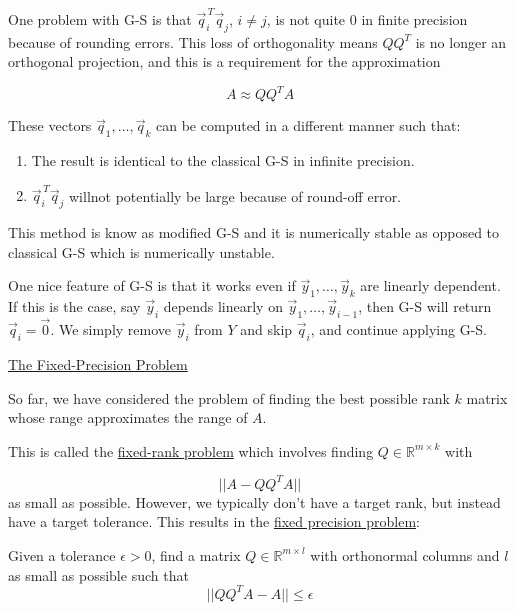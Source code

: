 One problem with G-S is that $\vec{q}^{\,T}_i\vec{q}_j$, $i \neq j$, is not quite 0 in finite precision because of rounding errors. This loss of orthogonality means $QQ^T$ is no longer an orthogonal projection, and this is a requirement for the approximation

\begin{equation*}
    A \approx QQ^TA
\end{equation*}

These vectors $\vec{q}_1, \ldots, \vec{q}_{k}$ can be computed in a different manner such that:

\begin{enumerate}[1)]
    \item The result is identical to the classical G-S in infinite precision.
    \item $\vec{q}^{\,T}_i\vec{q}_j$ willnot potentially be large because of round-off error.
\end{enumerate}
This method is know as modified G-S and it is numerically stable as opposed to classical G-S which is numerically unstable.

One nice feature of G-S is that it works even if $\vec{y}_1, \ldots, \vec{y}_{k}$ are linearly dependent. If this is the case, say $\vec{y}_i$ depends linearly on $\vec{y}_1, \ldots, \vec{y}_{i-1}$, then G-S will return $\vec{q}_i=\vec{0}$. We simply remove $\vec{y}_i$ from $Y$ and skip $\vec{q}_i$, and continue applying G-S.

\underline{The Fixed-Precision Problem}

So far, we have considered the problem of finding the best possible rank $k$ matrix whose range approximates the range of $A$.

This is called the \underline{fixed-rank problem} which involves finding $Q\in\mathbb{R}^{m\times k}$ with

\begin{equation*}
    ||A-QQ^TA||
\end{equation*}
as small as possible. However, we typically don't have a target rank, but instead have a target tolerance. This results in the \underline{fixed precision problem}:

\begin{displayquote}
    Given a tolerance $\epsilon > 0$, find a matrix $Q\in\mathbb{R}^{m\times l}$ with orthonormal columns and $l$ as small as possible such that
    \begin{equation*}
        ||QQ^TA-A||\leq \epsilon
    \end{equation*}
\end{displayquote}

